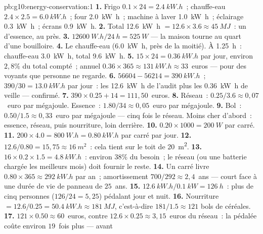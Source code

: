 \begin{solution}{pb:g10:energy-conservation:1}
\textbf{1.} Frigo $0.1 \times 24 = \qty{2.4}{kW.h}$~; chauffe-eau
$2.4 \times 2.5 = \qty{6.0}{kW.h}$~; four \qty{2.0}{kW.h}~; machine à
laver \qty{1.0}{kW.h}~; éclairage \qty{0.3}{kW.h}~; écrans
\qty{0.9}{kW.h}.
\textbf{2.} Total \qty{12.6}{kW.h} $= 12.6 \times 3.6 \approx
\qty{45}{MJ}$~: un  d'essence, au
 près.
\textbf{3.} $\qty{12600}{W.h}/\qty{24}{h} = \qty{525}{W}$ --- la maison
tourne au quart d'une bouilloire.
\textbf{4.} Le chauffe-eau (\qty{6.0}{kW.h}, près de la moitié). À
\qty{1.25}{h}~: chauffe-eau \qty{3.0}{kW.h}, total \qty{9.6}{kW.h}.
\textbf{5.} $15 \times 24 = \qty{0.36}{kW.h}$ par jour, environ
$2{,}8\%$ du total compté~; annuel $0.36 \times 365 \approx
\qty{131}{kW.h} \approx 33$~euros --- pour des voyants que personne ne
regarde.
\textbf{6.} $56604 - 56214 = \qty{390}{kW.h}$~;
$390/30 = \qty{13.0}{kW.h}$ par jour~: les \qty{12.6}{kW.h} de
l'audit plus les \qty{0.36}{kW.h} de veille --- confirmé.
\textbf{7.} $390 \times 0.25 + 14 = 111{,}50$~euros.
\textbf{8.} Réseau~: $0.25/3.6 \approx 0{,}07$~euro par mégajoule.
Essence~: $1.80/34 \approx 0{,}05$~euro par mégajoule.
\textbf{9.} Bol~: $0.50/1.5 \approx 0{,}33$~euro par mégajoule ---
cinq fois le réseau. Moins cher d'abord~: essence, réseau, puis
nourriture, loin derrière.
\textbf{10.} $0.20 \times 1000 = \qty{200}{W}$ par
 carré.
\textbf{11.} $200 \times 4.0 = \qty{800}{W.h} = \qty{0.80}{kW.h}$ par
 carré par jour.
\textbf{12.} $12.6/0.80 = 15{,}75 \approx \qty{16}{m^2}$~: cela tient
sur le toit de \qty{20}{m^2}.
\textbf{13.} $16 \times 0.2 \times 1.5 = \qty{4.8}{kW.h}$~: environ
$38\%$ du besoin~; le réseau (ou une batterie chargée les meilleurs
mois) doit fournir le reste.
\textbf{14.} Un  carré livre $0.80 \times 365 \approx
\qty{292}{kW.h}$ par an~; amortissement $700/292 \approx 2{,}4$~ans ---
court face à une durée de vie de panneau de $25$~ans.
\textbf{15.} $\qty{12.6}{kW.h}/\qty{0.1}{kW} = \qty{126}{h}$~: plus de
cinq personnes ($126/24 = 5{,}25$) pédalant jour et nuit.
\textbf{16.} Nourriture $= 12.6/0.25 = \qty{50.4}{kW.h} \approx
\qty{181}{MJ}$, c'est-à-dire $181/1.5 \approx 121$ bols de céréales.
\textbf{17.} $121 \times 0.50 \approx 60$~euros, contre
$12.6 \times 0.25 \approx 3{,}15$~euros du réseau~: la
 pédalée coûte environ $19$~fois plus --- avant

\end{solution}
